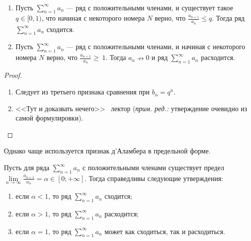 \documentclass[a4paper, 12pt]{article}
\begin{document}
\begin{Test}\
		\begin{enumerate}
		\item 	Пусть $\sum\limits_{n=1}^{\infty} a_n$ --- ряд с положительными членами, и существует такое $q \in [0, 1)$, что начиная с некоторого номера $N$ верно, что $\frac{a_{n+1}}{a_n} \leqslant q$. Тогда ряд $\sum\limits_{n=1}^{\infty} a_n$ сходится.
		\item Пусть $\sum\limits_{n=1}^{\infty} a_n$ --- ряд с положительными членами, и начиная с некоторого номера $N$ верно, что $\frac{a_{n+1}}{a_n} \geqslant~1$. Тогда $a_n \nrightarrow 0$ и ряд $\sum\limits_{n=1}^{\infty} a_n$ расходится.
	\end{enumerate}
\end{Test}

\begin{proof}
\ 
\begin{enumerate}
	\item 	Следует из третьего признака сравнения при $b_n = q^n$. 
	\item <<Тут и доказвать нечего>> \textcopyright\ лектор (\textit{прим. ред.:} утверждение очевидно из самой формулировки).
\end{enumerate}
\end{proof}

Однако чаще используется признак д'Аламбера в предельной форме.

\begin{Consequence}
Пусть для ряда $\sum\limits_{n=1}^{\infty} a_n$ с положительными членами существует предел $\lim\limits_{n\rightarrow\infty} \frac{a_{n+1}}{a_n} = \alpha \in [0; +\infty]$. Тогда справедливы следующие утверждения:
\begin{enumerate}
	\item если $\alpha < 1$, то ряд $\sum\limits_{n=1}^{\infty} a_n$ сходится;
	\item если $\alpha > 1$, то ряд $\sum\limits_{n=1}^{\infty} a_n$ расходится;
	\item если $\alpha = 1$, то ряд $\sum\limits_{n=1}^{\infty} a_n$ может как сходиться, так и расходиться. 
\end{enumerate}
\end{Consequence}
\end{document}
